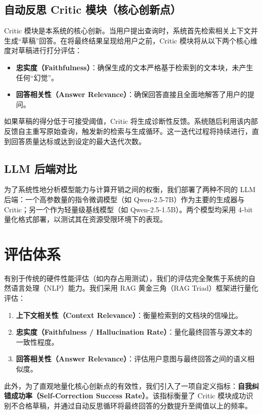 \documentclass[11pt,a4paper]{article}
\begin{document}
\subsection{自动反思 Critic 模块（核心创新点）}
Critic 模块是本系统的核心创新。当用户提出查询时，系统首先检索相关上下文并生成“草稿”回答。在将最终结果呈现给用户之前，Critic 模块将从以下两个核心维度对草稿进行打分评估：
\begin{itemize}
    \item \textbf{忠实度（Faithfulness）}：确保生成的文本严格基于检索到的文本块，未产生任何“幻觉”。
    \item \textbf{回答相关性（Answer Relevance）}：确保回答直接且全面地解答了用户的提问。
\end{itemize}
如果草稿的得分低于可接受阈值，Critic 将生成诊断性反馈。系统随后利用该内部反馈自主重写原始查询，触发新的检索与生成循环。这一迭代过程将持续进行，直到回答质量达标或达到设定的最大迭代次数。

\subsection{LLM 后端对比}
为了系统性地分析模型能力与计算开销之间的权衡，我们部署了两种不同的 LLM 后端：一个高参数量的指令微调模型（如 Qwen-2.5-7B）作为主要的生成器与 Critic；另一个作为轻量级基线模型（如 Qwen-2.5-1.5B）。两个模型均采用 4-bit 量化格式部署，以测试其在资源受限环境下的表现。

\section{评估体系}
有别于传统的硬件性能评估（如内存占用测试），我们的评估完全聚焦于系统的自然语言处理（NLP）能力。我们采用 RAG 黄金三角（RAG Triad）框架进行量化评估：

\begin{enumerate}
    \item \textbf{上下文相关性（Context Relevance）}：衡量检索到的文档块的信噪比。
    \item \textbf{忠实度（Faithfulness / Hallucination Rate）}：量化最终回答与源文本的一致性程度。
    \item \textbf{回答相关性（Answer Relevance）}：评估用户意图与最终回答之间的语义相似度。
\end{enumerate}

此外，为了直观地量化核心创新点的有效性，我们引入了一项自定义指标：\textbf{自我纠错成功率（Self-Correction Success Rate）}。该指标衡量了 Critic 模块成功识别不合格草稿，并通过自动反思循环将最终回答的分数提升至阈值以上的频率。
\end{document}
